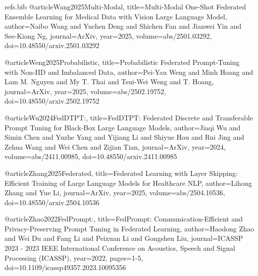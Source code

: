 \begin{filecontents}{refs.bib}
@article{Wang2025Multi-Modal,
title={Multi-Modal One-Shot Federated Ensemble Learning for Medical Data with Vision Large Language Model},
author={Naibo Wang and Yuchen Deng and Shichen Fan and Jianwei Yin and See-Kiong Ng},
journal={ArXiv},
year={2025},
volume={abs/2501.03292},
doi={10.48550/arxiv.2501.03292}
}

@article{Weng2025Probabilistic,
title={Probabilistic Federated Prompt-Tuning with Non-IID and Imbalanced Data},
author={Pei-Yau Weng and Minh Hoang and Lam M. Nguyen and My T. Thai and Tsui-Wei Weng and T. Hoang},
journal={ArXiv},
year={2025},
volume={abs/2502.19752},
doi={10.48550/arxiv.2502.19752}
}

@article{Wu2024FedDTPT:,
title={FedDTPT: Federated Discrete and Transferable Prompt Tuning for Black-Box Large Language Models},
author={Jiaqi Wu and Simin Chen and Yuzhe Yang and Yijiang Li and Shiyue Hou and Rui Jing and Zehua Wang and Wei Chen and Zijian Tian},
journal={ArXiv},
year={2024},
volume={abs/2411.00985},
doi={10.48550/arxiv.2411.00985}
}

@article{Zhang2025Federated,
title={Federated Learning with Layer Skipping: Efficient Training of Large Language Models for Healthcare NLP},
author={Lihong Zhang and Yue Li},
journal={ArXiv},
year={2025},
volume={abs/2504.10536},
doi={10.48550/arxiv.2504.10536}
}

@article{Zhao2022FedPrompt:,
title={FedPrompt: Communication-Efficient and Privacy-Preserving Prompt Tuning in Federated Learning},
author={Haodong Zhao and Wei Du and Fang Li and Peixuan Li and Gongshen Liu},
journal={ICASSP 2023 - 2023 IEEE International Conference on Acoustics, Speech and Signal Processing (ICASSP)},
year={2022},
pages={1-5},
doi={10.1109/icassp49357.2023.10095356}
}
\end{filecontents}

\documentclass{article}
\usepackage{adjustbox}


\section*{\textbf{Heterogeneous Federated Prompt Optimization for Medical QA:} How Novel Is It?}


HFPO sits at the intersection of federated prompt learning, evolutionary prompt search, and medical LLM evaluation. Existing work gets close to each piece separately, but does not appear to combine them in exactly the way you propose.


\subsection*{Closest Existing Directions}


